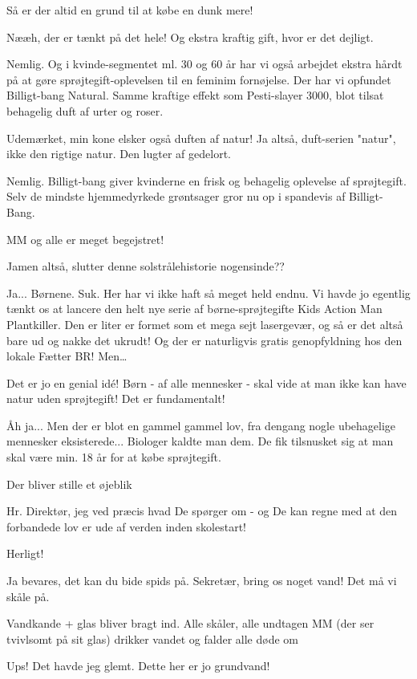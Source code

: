 \documentclass[a4paper,12pt]{article}
\begin{document}
\begin{sketch}
 Så er der altid en grund til at købe en dunk mere!

 Nææh, der er tænkt på det hele! Og ekstra kraftig gift, hvor er det dejligt.

 Nemlig. Og i kvinde-segmentet ml. 30 og 60 år har vi også arbejdet ekstra hårdt på at gøre sprøjtegift-oplevelsen til en feminim fornøjelse. Der har vi opfundet Billigt-bang Natural. Samme kraftige effekt som Pesti-slayer 3000, blot tilsat behagelig duft af urter og roser.


 Udemærket, min kone elsker også duften af natur! Ja altså, duft-serien "natur", ikke den rigtige natur. Den lugter af gedelort.

 Nemlig. Billigt-bang giver kvinderne en frisk og behagelig oplevelse af sprøjtegift. Selv de mindste hjemmedyrkede grøntsager gror nu op i spandevis af Billigt-Bang.

\scene MM og alle er meget begejstret!

 Jamen altså, slutter denne solstrålehistorie nogensinde?? 

 Ja... Børnene. Suk. Her har vi ikke haft så meget held endnu. Vi havde jo egentlig tænkt os at lancere den helt nye serie af børne-sprøjtegifte Kids Action Man Plantkiller. Den er  liter er formet som et mega sejt lasergevær, og så er det altså bare ud og nakke det ukrudt! Og der er naturligvis gratis genopfyldning hos den lokale Fætter BR! Men\ldots

 Det er jo en genial idé! Børn - af alle mennesker - skal vide at man ikke kan have natur uden sprøjtegift! Det er fundamentalt!

 Åh ja... Men der er blot en gammel gammel lov, fra dengang nogle ubehagelige mennesker eksisterede... Biologer kaldte man dem. De fik tilsnusket sig at man skal være min. 18 år for at købe sprøjtegift.

\scene Der bliver stille et øjeblik

 Hr. Direktør, jeg ved præcis hvad De spørger om - og De kan regne med at den forbandede lov er ude af verden inden skolestart!

 Herligt!

 Ja bevares, det kan du bide spids på. Sekretær, bring os noget vand! Det må vi skåle på.

\scene Vandkande + glas bliver bragt ind. Alle skåler, alle undtagen MM (der ser tvivlsomt på sit glas) drikker vandet og falder alle døde om

 Ups! Det havde jeg glemt. Dette her er jo grundvand!




\end{sketch}
\end{document}
